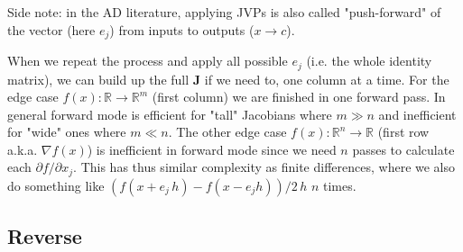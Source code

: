 \documentclass[paper=a4,11pt,headsepline]{scrartcl}
\newcommand{\ve}[1]{\ensuremath{\bm{\mathit{#1}}}}
\newcommand{\ma}[1]{\ensuremath{\bm{\mathbf{#1}}}}
\newcommand{\ra}{\ensuremath{\rightarrow}}
\newcommand{\pdi}[2]{\partial #1/\partial #2}
\begin{document}
Side note: in the AD literature, applying JVPs is also called
"push-forward" of the vector (here $\ve e_j$) from inputs to outputs ($\ve x\ra\ve c$).

When we repeat the process and apply all possible $\ve e_j$ (i.e. the whole
identity matrix), we can build up the full $\ma J$ if we need to, one column at
a time. For the edge case $\ve f(x): \mathbb R \ra \mathbb R^m$ (first column)
we are finished in one forward pass. In general forward mode is efficient for
"tall" Jacobians where $m\gg n$ and inefficient for "wide" ones where $m\ll n$.
The other edge case $f(\ve x): \mathbb R^n \ra \mathbb R$ (first row a.k.a.
$\nabla f(\ve x)$) is inefficient in forward mode since we need $n$ passes to
calculate each $\pdi{f}{x_j}$. This has thus similar complexity as finite
differences, where we also do something like $(f(\ve x +\ve e_j\,h) - f(\ve
x-\ve e_j h))/2\,h$ $n$ times.

\subsection{Reverse}
\end{document}
